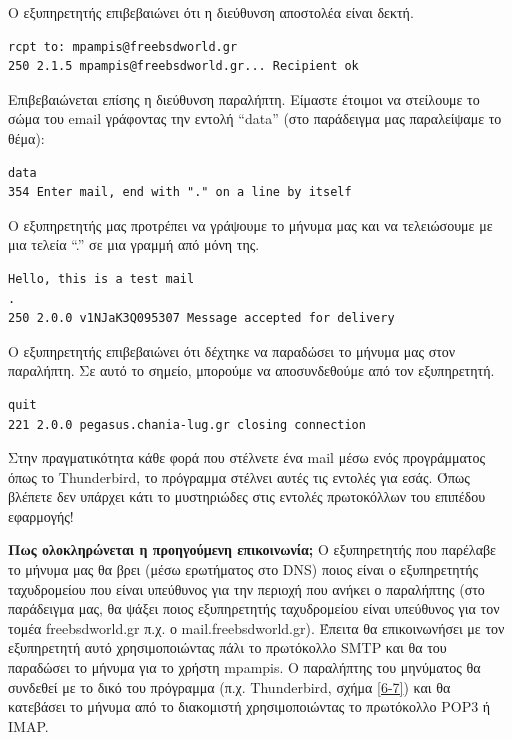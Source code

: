 \begin{inthebox}
Ο εξυπηρετητής επιβεβαιώνει ότι η διεύθυνση αποστολέα είναι δεκτή.

\begin{verbatim}
rcpt to: mpampis@freebsdworld.gr
250 2.1.5 mpampis@freebsdworld.gr... Recipient ok
\end{verbatim}

Επιβεβαιώνεται επίσης η διεύθυνση παραλήπτη. Είμαστε έτοιμοι να στείλουμε το σώμα του email γράφοντας την εντολή ``data'' (στο παράδειγμα μας παραλείψαμε το θέμα):

\begin{verbatim}
data
354 Enter mail, end with "." on a line by itself
\end{verbatim}

Ο εξυπηρετητής μας προτρέπει να γράψουμε το μήνυμα μας και να τελειώσουμε με μια τελεία ``.'' σε μια γραμμή από μόνη της.

\begin{verbatim}
Hello, this is a test mail
.
250 2.0.0 v1NJaK3Q095307 Message accepted for delivery
\end{verbatim}

Ο εξυπηρετητής επιβεβαιώνει ότι δέχτηκε να παραδώσει το μήνυμα μας στον παραλήπτη. Σε αυτό το σημείο, μπορούμε να αποσυνδεθούμε από τον εξυπηρετητή.

\begin{verbatim}
quit
221 2.0.0 pegasus.chania-lug.gr closing connection
\end{verbatim}


Στην πραγματικότητα κάθε φορά που στέλνετε ένα mail μέσω ενός προγράμματος όπως το Thunderbird, το πρόγραμμα στέλνει αυτές τις εντολές για εσάς. Όπως βλέπετε δεν υπάρχει κάτι το μυστηριώδες στις εντολές πρωτοκόλλων του επιπέδου εφαρμογής!\\
\end{inthebox}

\textbf{Πως ολοκληρώνεται η προηγούμενη επικοινωνία;} Ο εξυπηρετητής που παρέλαβε το μήνυμα μας θα βρει (μέσω ερωτήματος στο DNS) ποιος είναι ο εξυπηρετητής ταχυδρομείου που είναι υπεύθυνος για την περιοχή που ανήκει ο παραλήπτης (στο παράδειγμα μας, θα ψάξει ποιος εξυπηρετητής ταχυδρομείου είναι υπεύθυνος για τον τομέα freebsdworld.gr π.χ. ο mail.freebsdworld.gr). Έπειτα θα επικοινωνήσει με τον εξυπηρετητή αυτό χρησιμοποιώντας πάλι το πρωτόκολλο SMTP και θα του παραδώσει το μήνυμα για το χρήστη mpampis. Ο παραλήπτης του μηνύματος θα συνδεθεί με το δικό του πρόγραμμα (π.χ. Thunderbird, σχήμα \ref{6-7}) και θα κατεβάσει το μήνυμα από το διακομιστή χρησιμοποιώντας το πρωτόκολλο POP3 ή IMAP.



